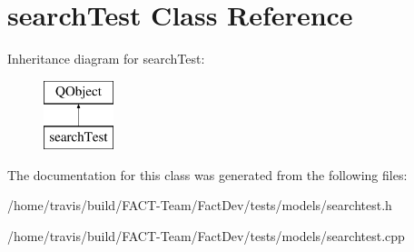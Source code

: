 \hypertarget{classsearchTest}{\section{search\-Test Class Reference}
\label{classsearchTest}
}
Inheritance diagram for search\-Test\-:\begin{figure}[H]
\begin{center}
\leavevmode
\includegraphics[height=2.000000cm]{d7/d51/classsearchTest}
\end{center}
\end{figure}


The documentation for this class was generated from the following files\-:\begin{DoxyCompactItemize}
\item 
/home/travis/build/\-F\-A\-C\-T-\/\-Team/\-Fact\-Dev/tests/models/searchtest.\-h\item 
/home/travis/build/\-F\-A\-C\-T-\/\-Team/\-Fact\-Dev/tests/models/searchtest.\-cpp\end{DoxyCompactItemize}

